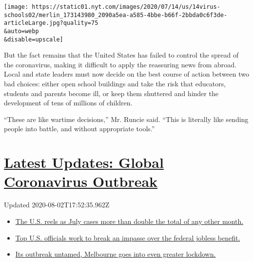 \texttt{[image: https://static01.nyt.com/images/2020/07/14/us/14virus-schools02/merlin\_173143980\_2090a5ea-a585-4bbe-b66f-2bbda0c6f3de-articleLarge.jpg?quality=75\\\&auto=webp\\\&disable=upscale]}

But the fact remains that the United States has failed to control the
spread of the coronavirus, making it difficult to apply the reassuring
news from abroad. Local and state leaders must now decide on the best
course of action between two bad choices: either open school buildings
and take the risk that educators, students and parents become ill, or
keep them shuttered and hinder the development of tens of millions of
children.

``These are like wartime decisions,'' Mr. Runcie said. ``This is
literally like sending people into battle, and without appropriate
tools.''

\hypertarget{latest-updates-global-coronavirus-outbreak}{%
\section{\texorpdfstring{\href{https://www.nytimes.com/2020/08/01/world/coronavirus-covid-19.html?action=click\&pgtype=Article\&state=default\&region=MAIN_CONTENT_1\&context=storylines_live_updates}{Latest
Updates: Global Coronavirus
Outbreak}}{Latest Updates: Global Coronavirus Outbreak}}\label{latest-updates-global-coronavirus-outbreak}}

Updated 2020-08-02T17:52:35.962Z

\begin{itemize}
\tightlist
\item
  \href{https://www.nytimes.com/2020/08/01/world/coronavirus-covid-19.html?action=click\&pgtype=Article\&state=default\&region=MAIN_CONTENT_1\&context=storylines_live_updates\#link-34047410}{The
  U.S. reels as July cases more than double the total of any other
  month.}
\item
  \href{https://www.nytimes.com/2020/08/01/world/coronavirus-covid-19.html?action=click\&pgtype=Article\&state=default\&region=MAIN_CONTENT_1\&context=storylines_live_updates\#link-780ec966}{Top
  U.S. officials work to break an impasse over the federal jobless
  benefit.}
\item
  \href{https://www.nytimes.com/2020/08/01/world/coronavirus-covid-19.html?action=click\&pgtype=Article\&state=default\&region=MAIN_CONTENT_1\&context=storylines_live_updates\#link-2bc8948}{Its
  outbreak untamed, Melbourne goes into even greater lockdown.}
\end{itemize}

